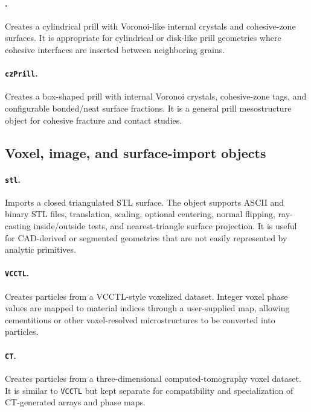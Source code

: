 \paragraph{.}Creates a cylindrical prill with Voronoi-like internal crystals and cohesive-zone surfaces.  It is appropriate for cylindrical or disk-like prill geometries where cohesive interfaces are inserted between neighboring grains.

\paragraph{\texttt{czPrill}.}Creates a box-shaped prill with internal Voronoi crystals, cohesive-zone tags, and configurable bonded/neat surface fractions.  It is a general prill mesostructure object for cohesive fracture and contact studies.

\subsection{Voxel, image, and surface-import objects}

\paragraph{\texttt{stl}.}Imports a closed triangulated STL surface.  The object supports ASCII and binary STL files, translation, scaling, optional centering, normal flipping, ray-casting inside/outside tests, and nearest-triangle surface projection.  It is useful for CAD-derived or segmented geometries that are not easily represented by analytic primitives.

\paragraph{\texttt{VCCTL}.}Creates particles from a VCCTL-style voxelized dataset.  Integer voxel phase values are mapped to material indices through a user-supplied map, allowing cementitious or other voxel-resolved microstructures to be converted into particles.

\paragraph{\texttt{CT}.}Creates particles from a three-dimensional computed-tomography voxel dataset.  It is similar to \texttt{VCCTL} but kept separate for compatibility and specialization of CT-generated arrays and phase maps.

